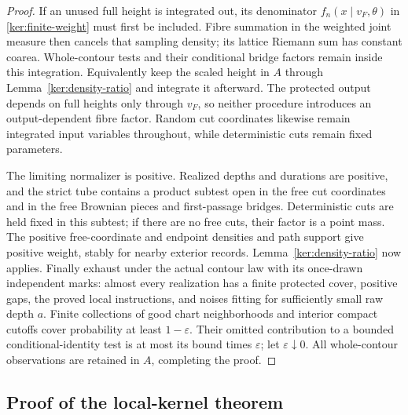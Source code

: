 \begin{proof}
If an unused full height is integrated out, its denominator
\(f_n(x\mid v_F,\theta)\) in \eqref{ker:finite-weight} must first be
included.  Fibre summation in the weighted joint measure then cancels
that sampling density; its lattice Riemann sum has constant coarea.
Whole-contour tests and their conditional bridge factors remain
inside this integration.  Equivalently keep the scaled height in
\(A\) through Lemma~\ref{ker:density-ratio} and integrate it afterward.
The protected output depends on full heights only through \(v_F\),
so neither procedure introduces an output-dependent fibre factor.
Random cut coordinates likewise remain integrated input variables
throughout, while deterministic cuts remain fixed parameters.

The limiting normalizer is positive. Realized depths and durations
are positive, and the strict tube contains a product subtest open
in the free cut coordinates and in the free Brownian pieces and
first-passage bridges. Deterministic cuts are held fixed in this
subtest; if there are no free cuts, their factor is a point mass.
The positive free-coordinate and endpoint densities and path support
give positive weight, stably for nearby exterior records.
Lemma~\ref{ker:density-ratio} now applies.
Finally exhaust under the actual contour law with its once-drawn
independent marks: almost every realization has a finite protected
cover, positive gaps, the proved local instructions, and noises fitting
for sufficiently small raw depth \(a\).  Finite collections of good
chart neighborhoods and interior compact cutoffs cover probability
at least \(1-\varepsilon\).  Their omitted contribution to a bounded
conditional-identity test is at most its bound times
\(\varepsilon\); let \(\varepsilon\downarrow0\).
All whole-contour observations are retained in \(A\), completing the
proof.
\end{proof}


\subsection{Proof of the local-kernel theorem}

